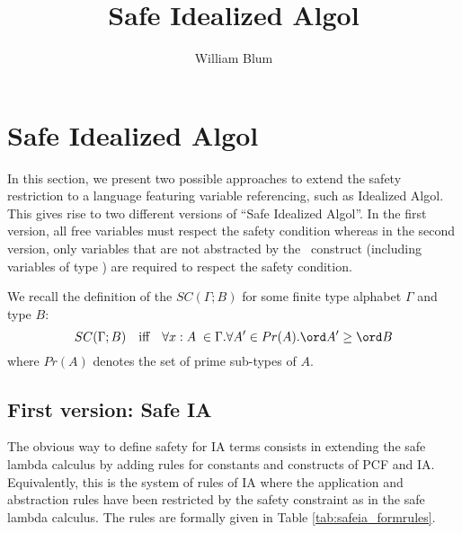 



\author{William Blum}
\title{Safe Idealized Algol}


\maketitle

\section{Safe Idealized Algol}

In this section, we present two possible approaches to extend the
safety restriction to a language featuring variable referencing,
such as Idealized Algol. This gives rise to two different versions
of ``Safe Idealized Algol''. In the first version, all free
variables must respect the safety condition whereas in the second
version, only variables that are not abstracted by the \ianew\
construct (including variables of type \iavar) are required to
respect the safety condition.

We recall the definition of the  $SC(\Gamma ; B)$
for some finite type alphabet $\Gamma$ and type $B$:
$$SC(\Gamma ; B) \quad \mbox{iff} \quad  \forall x:A\; \in \Gamma . \forall A' \in Pr(A) . \ord A' \geq \ord B$$
where $Pr(A)$ denotes the set of prime sub-types of $A$.



\subsection{First version: Safe IA}

 The obvious way to define safety for IA terms consists in extending the safe lambda calculus by adding rules
 for constants and constructs of PCF and IA.
 Equivalently, this is the system of rules of IA where the application and abstraction rules  have been restricted by the safety constraint as in the safe lambda calculus.
The rules are formally given in Table \ref{tab:safeia_formrules}.


\newlength{\mylength}
\newenvironment{FramedTable}%
{\begin{table}[htbp]
\begin{Sbox}%
\setlength{\mylength}{\textwidth}%
\addtolength{\mylength}{-2\fboxsep}%
\addtolength{\mylength}{-2\fboxrule}%
\begin{minipage}{\mylength}}%
{\end{minipage}\end{Sbox}\shadowbox{\TheSbox}\end{table}}%



